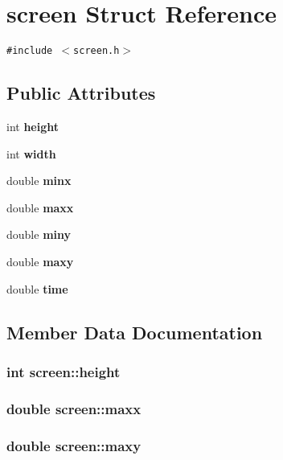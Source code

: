 \section{screen Struct Reference}
\label{structscreen}
{\tt \#include $<$screen.h$>$}

\subsection*{Public Attributes}
\begin{CompactItemize}
\item 
int {\bf height}
\item 
int {\bf width}
\item 
double {\bf minx}
\item 
double {\bf maxx}
\item 
double {\bf miny}
\item 
double {\bf maxy}
\item 
double {\bf time}
\end{CompactItemize}


\subsection{Member Data Documentation}
\subsubsection[{height}]{\setlength{\rightskip}{0pt plus 5cm}int {\bf screen::height}}\label{structscreen_bf92d5370ef230dd4c6f603435341f50}


\subsubsection[{maxx}]{\setlength{\rightskip}{0pt plus 5cm}double {\bf screen::maxx}}\label{structscreen_44a54fff987e77df78e735135c49a06c}


\subsubsection[{maxy}]{\setlength{\rightskip}{0pt plus 5cm}double {\bf screen::maxy}}\label{structscreen_ed903ce1e7c63258fff721dd7589d664}


